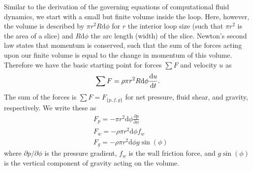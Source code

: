 \documentclass[pre,twocolumn,twoside,byrevtex,superscriptaddress]{revtex4}
\newcommand{\pdiff}[2]{\frac{\partial #1}{\partial #2}}
\newcommand{\diff}[2]{\frac{{\rm d}#1}{{\rm d}#2}}
\begin{document}
Similar to the derivation of the governing equations of computational fluid dynamics, we start with a small but finite volume inside the loop.
Here, however, the volume is described by $\pi r^2 R \text{d} \phi$ for $r$ the interior loop size (such that $\pi r^2$ is the area of a slice) and $R\text{d}\phi$ the arc length (width) of the slice.
Newton's second law states that momentum is conserved, such that the sum of the forces acting upon our finite volume is equal to the change in momentum of this volume.
Therefore we have the basic starting point for forces $\sum F$ and velocity $u$ as
\begin{equation} \sum F = \rho \pi r^2 R \text{d}\phi \diff{u}{t} .\end{equation}
The sum of the forces is $\sum F = F_{\{p,f,g\}}$ for net pressure, fluid shear, and gravity, respectively.
We write these as
\begin{align} & F_p = -\pi r^2 \text{d} \phi \pdiff{p}{\phi}\\
& F_w = -\rho \pi r^2 \text{d} \phi f_w\\
& F_g = -\rho \pi r^2 \text{d} \phi g \sin (\phi)\end{align}
where $\partial p /\partial \phi$ is the pressure gradient, $f_w$ is the wall friction force, and $g \sin (\phi)$ is the vertical component of gravity acting on the volume.
\end{document}
